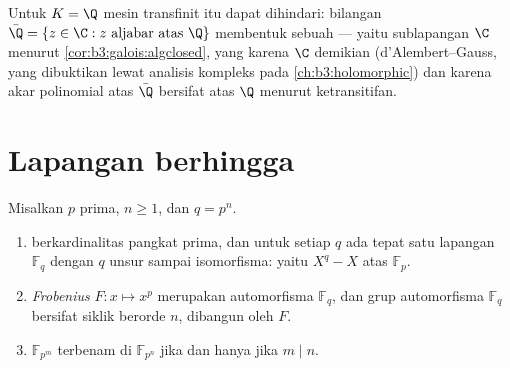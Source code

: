\begin{remark}\label{rem:b3:galois:closureexamples}
Untuk $K = \Q$ mesin transfinit itu dapat dihindari:
bilangan  $\bar\Q = \{z \in \C : z \text{ aljabar atas
} \Q\}$ membentuk sebuah  --- yaitu sublapangan $\C$ menurut
\cref{cor:b3:galois:algclosed}, yang  karena $\C$
demikian (d'Alembert--Gauss, yang dibuktikan lewat analisis kompleks pada
\cref{ch:b3:holomorphic}) dan karena akar polinomial atas $\bar\Q$
bersifat  atas $\Q$ menurut ketransitifan.
\end{remark}

\section{Lapangan berhingga}

\begin{theorem}\label{thm:b3:galois:finitefields}
Misalkan $p$ prima, $n \geq 1$, dan $q = p^n$.
\begin{enumerate}
  \item {} berkardinalitas pangkat prima, dan untuk
        setiap $q$ ada tepat satu lapangan $\mathbb F_q$ dengan
        $q$ unsur sampai isomorfisma: yaitu 
        $X^q - X$ atas $\mathbb F_p$.
  \item \emph{Frobenius} $F
        \colon x \mapsto x^p$ merupakan automorfisma $\mathbb
        F_q$, dan grup automorfisma $\mathbb F_q$ bersifat
        siklik berorde $n$, dibangun oleh $F$.
  \item $\mathbb F_{p^m}$ terbenam di $\mathbb F_{p^n}$ jika dan hanya jika $m \mid
        n$.
\end{enumerate}
\end{theorem}

